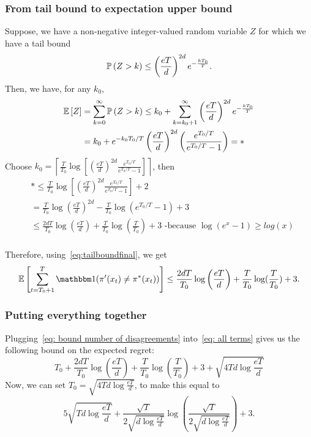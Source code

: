 \documentclass[11pt]{article}
\begin{document}
\subsubsection{From tail bound to expectation upper bound}

Suppose, we have a non-negative integer-valued random variable $Z$ for which we have a tail bound 
\[
\mathbb{P}\left( Z > k \right) \le \left(\frac{eT}{d}\right)^{2d} e^{-\frac{kT_0}{T}} .
\]
Then, we have, for any $k_0$,
\begin{align*}
\mathbb{E}\left[ Z \right] &= \sum_{k=0}^\infty \mathbb{P}\left( Z > k \right) \le k_0 + \sum_{k=k_0+1}^\infty \left(\frac{eT}{d}\right)^{2d} e^{-\frac{kT_0}{T}} \\
& = k_0 + e^{-k_0T_0/T} \left(\frac{eT}{d}\right)^{2d} \left( \frac {e^{T_0/T}}{e^{T_0/T} - 1} \right)  = *\\
\end{align*} 
Choose $k_0 = \left \lceil \frac{T}{T_0} \log \left[ \left(\frac{eT}{d} \right)^{2d} \frac {e^{T_0/T}}{e^{T_0/T} - 1}\right] \right\rceil$, then
\begin{align*}
& * \leq \frac{T}{T_0} \log \left[ \left(\frac{eT}{d} \right)^{2d} \frac {e^{T_0/T}}{e^{T_0/T} - 1}\right] + 2 \\
& = \frac{T}{T_0} \log \left(\frac{eT}{d} \right)^{2d} - \frac{T}{T_0}  \log (e^{T_0/T} - 1) + 3 \\
& \leq \frac{2dT}{T_0} \log \left(\frac{eT}{d} \right) + \frac{T}{T_0} \log (\frac{T}{T_0}) + 3  \text{ \ \ \ \ \ \ \ \    -because } \log(e^x-1) \geq log(x)\\
\end{align*}

Therefore, using~\eqref{eq:tailboundfinal}, we get
\begin{equation}\label{eq: bound number of disagreements}
\E{\sum_{t=T_0+1}^T\ind(\pi'(x_t)\neq \pi^*(x_t))} \le \frac{2dT}{T_0} \log \left(\frac{eT}{d} \right) + \frac{T}{T_0} \log (\frac{T}{T_0}) + 3 .
\end{equation}

\subsubsection{Putting everything together}

Plugging~\eqref{eq: bound number of disagreements} into~\eqref{eq: all terms} gives us the following bound on the expected regret:
\[
T_0 + \frac{2dT}{T_0} \log \left(\frac{eT}{d} \right) + \frac{T}{T_0} \log (\frac{T}{T_0}) + 3 + \sqrt{ 4Td \log{\frac{eT}{d}} }
\]
Now, we can set $T_0 = \sqrt{4Td \log{\frac{eT}{d}} }$, to make this equal to
\[
5 \sqrt{Td \log{\frac{eT}{d}} } + \frac{\sqrt{T}}{2\sqrt{d \log{\frac{eT}{d}}}}\log \left( \frac{\sqrt{T}}{2\sqrt{d \log{\frac{eT}{d}}}} \right)+ 3.
\]


\end{document}
